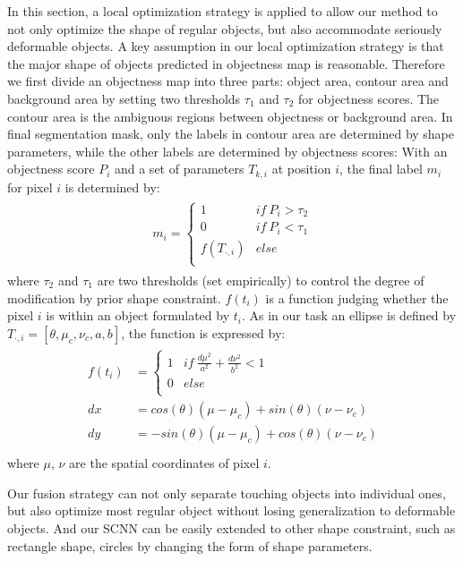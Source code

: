 In this section, a local optimization strategy is applied to allow our method to not only optimize the shape of regular objects, but also accommodate seriously deformable objects.
A key assumption in our local optimization strategy is that the major shape of objects predicted in objectness map is reasonable.
Therefore we first divide an objectness map into three parts: object area, contour area and background area by setting two thresholds $\tau_1$ and $\tau_2$ for objectness scores.
The contour area is the ambiguous regions between objectness or background area.
In final segmentation mask, only the labels in contour area are determined by shape parameters, while the other labels are determined by objectness scores:
With an objectness score $P_i$ and a set of parameters $T_{k,i}$ at position $i$, the final label $m_i$ for pixel $i$ is determined by:
%
\begin{eqnarray}\label{fusion}
\begin{aligned}
m_i=\left\{\begin{array}{cc}
1&if~P_i>\tau_2\\
0&if~P_i<\tau_1\\
f(T_{\cdot,i})&else\\
\end{array}\right.
\end{aligned}
\end{eqnarray}
where $\tau_2$ and $\tau_1$ are two thresholds (set empirically) to control the degree of modification by prior shape constraint.
$f(t_i)$ is a function judging whether the pixel $i$ is within an object formulated by $t_i$.
As in our task an ellipse is defined by $ T_{\cdot,i} = [\theta, \mu_c, \nu_c, a, b]$, the function is expressed by:
\begin{eqnarray}\label{fusion}
\begin{aligned}
f(t_i)&=\left\{\begin{array}{cc}
1&if~\frac{d\mu^2}{a^2}+\frac{d\nu^2}{b^2}<1\\
0&else\\
\end{array}\right.\\
dx &= cos(\theta)(\mu-\mu_c)+sin(\theta)(\nu-\nu_c)\\
dy &= -sin(\theta)(\mu-\mu_c)+cos(\theta)(\nu-\nu_c)\\
\end{aligned}
\end{eqnarray}
where $\mu$, $\nu$ are the spatial coordinates of pixel $i$.

Our fusion strategy can not only separate touching objects into individual ones, but also optimize most regular object without losing generalization to deformable objects.
And our SCNN can be easily extended to other shape constraint, such as rectangle shape, circles by changing the form of shape parameters.
